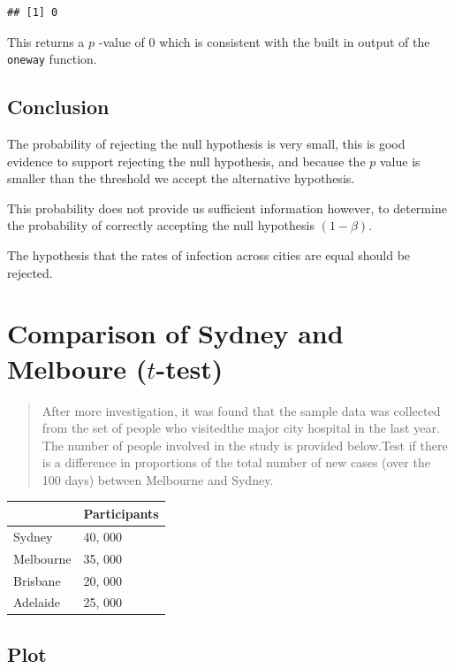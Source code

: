 \documentclass{article}
\newcommand{\passthrough}[1]{#1}
\begin{document}
\begin{lstlisting}
## [1] 0
\end{lstlisting}

This returns a \(p\) -value of 0 which is consistent with the built in
output of the \passthrough{\lstinline!oneway!} function.

\hypertarget{conclusion}{%
\subsection{Conclusion}\label{conclusion}}

The probability of rejecting the null hypothesis is very small, this is
good evidence to support rejecting the null hypothesis, and because the
\(p\) value is smaller than the threshold we accept the alternative
hypothesis.

This probability does not provide us sufficient information however, to
determine the probability of correctly accepting the null hypothesis
\((1-\beta)\).

The hypothesis that the rates of infection across cities are equal
should be rejected.

\hypertarget{question-2}{%
\section{Comparison of Sydney and Melboure \normalsize \qquad ($t$-test)}\label{question-2}}

\begin{quote}
After more investigation, it was found that the sample data was
collected from the set of people who visitedthe major city hospital in
the last year. The number of people involved in the study is provided
below.Test if there is a difference in proportions of the total number
of new cases (over the 100 days) between Melbourne and Sydney.
\end{quote}

\begin{longtable}[]{@{}ll@{}}
\toprule
& Participants\tabularnewline
\midrule
\endhead
Sydney & 40, 000\tabularnewline
Melbourne & 35, 000\tabularnewline
Brisbane & 20, 000\tabularnewline
Adelaide & 25, 000\tabularnewline
\bottomrule
\end{longtable}

\hypertarget{plot-1}{%
\subsection{Plot}\label{plot-1}}
\end{document}

